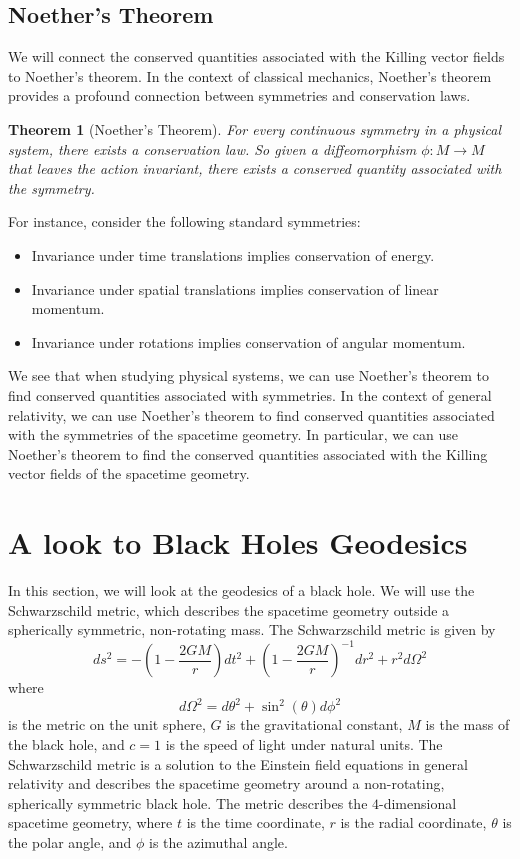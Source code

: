 \documentclass[12pt]{article}
\newtheorem{theorem}[definition]{Theorem}
\begin{document}
\subsection{Noether's Theorem}
We will connect the conserved quantities associated with the Killing vector fields to Noether's theorem.
In the context of classical mechanics, Noether's theorem provides a profound connection between symmetries and conservation laws.
\begin{theorem}[Noether's Theorem]
	For every continuous symmetry in a physical system, there exists a conservation law.
	So given a diffeomorphism \( \phi: M \to M \) that leaves the action invariant, there exists a conserved quantity associated with the symmetry.
\end{theorem}
For instance, consider the following standard symmetries:
\begin{itemize}
    \item Invariance under time translations implies conservation of energy.
    \item Invariance under spatial translations implies conservation of linear momentum.
    \item Invariance under rotations implies conservation of angular momentum.
\end{itemize}
We see that when studying physical systems, we can use Noether's theorem to find conserved quantities associated with symmetries.
In the context of general relativity, we can use Noether's theorem to find conserved quantities associated with the symmetries of the spacetime geometry.
In particular, we can use Noether's theorem to find the conserved quantities associated with the Killing vector fields of the spacetime geometry.

\section{A look to Black Holes Geodesics}

In this section, we will look at the geodesics of a black hole.
We will use the Schwarzschild metric, which describes the spacetime geometry outside a spherically symmetric, non-rotating mass. The Schwarzschild metric is given by
\begin{equation}\label{eq:schwarzschild_metric}
	ds^2 = -\left(1 - \frac{2GM}{r}\right) dt^2 + \left(1 - \frac{2GM}{r}\right)^{-1} dr^2 + r^2 d\Omega^2
\end{equation}
where 
\[
d\Omega^2 = d\theta^2 + \sin^2(\theta) d\phi^2
\] 
is the metric on the unit sphere, \(G\) is the gravitational constant, \(M\) is the mass of the black hole, and \(c = 1\) is the speed of light under natural units.
The Schwarzschild metric is a solution to the Einstein field equations in general relativity and describes the spacetime geometry around a non-rotating, spherically symmetric black hole.
The metric describes the $4$-dimensional spacetime geometry, where \(t\) is the time coordinate, \(r\) is the radial coordinate, \(\theta\) is the polar angle, and \(\phi\) is the azimuthal angle.
\end{document}
